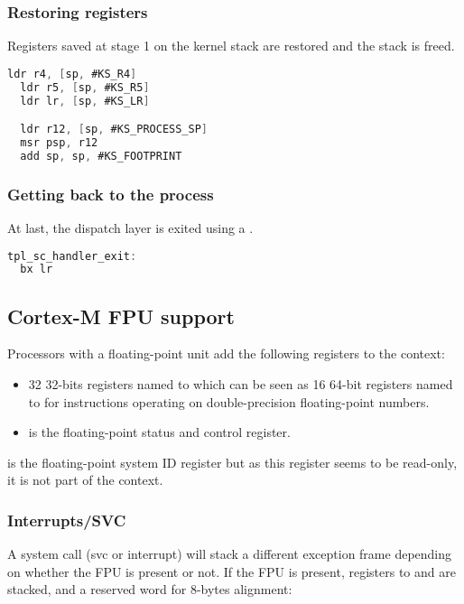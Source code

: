 \subsubsection{Restoring registers}

Registers saved at stage 1 on the kernel stack are restored and the stack is freed.

\begin{lstlisting}[language=C]
  ldr r4, [sp, #KS_R4]
  ldr r5, [sp, #KS_R5]
  ldr lr, [sp, #KS_LR]

  ldr r12, [sp, #KS_PROCESS_SP]
  msr psp, r12
  add sp, sp, #KS_FOOTPRINT	
\end{lstlisting}

\subsubsection{Getting back to the process}

At last, the dispatch layer is exited using a .

\begin{lstlisting}[language=C]
tpl_sc_handler_exit:
  bx lr
\end{lstlisting}

\subsection{Cortex-M FPU support}

Processors with a floating-point unit add the following registers to the context:
\begin{itemize}
\item 32 32-bits registers named  to  which can be seen as 16 64-bit registers named  to  for instructions operating on double-precision floating-point numbers.
\item {} is the floating-point status and control register.
\end{itemize}

 is the floating-point system ID register but as this register seems to be read-only, it is not part of the context.

\subsubsection{Interrupts/SVC}

A system call (svc or interrupt) will stack a different exception frame depending on whether the FPU is present or not. If the FPU is present, registers  to  and  are stacked, and a reserved word for 8-bytes alignment:

